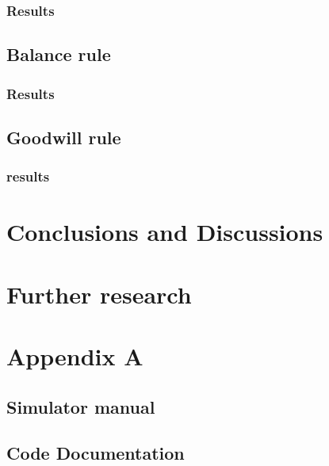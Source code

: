 \documentclass[twoside,openright]{uva-bachelor-thesis}
\begin{document}
\subsection{Results}

\section{Balance rule}

\subsection{Results}

\section{Goodwill rule}

\subsection{results}

\chapter{Conclusions and Discussions}

\chapter{Further research}

\chapter{Appendix A}

\section{Simulator manual}

\section{Code Documentation}
\end{document}
